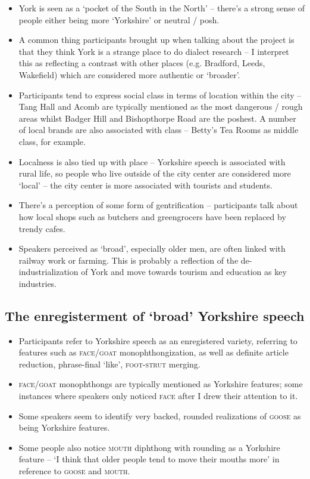 \documentclass{article}
\begin{document}
\begin{itemize}
\item{York is seen as a `pocket of the South in the North' -- there's a strong sense of people either being more `Yorkshire' or neutral / posh.}
\item{A common thing participants brought up when talking about the project is that they think York is a strange place to do dialect research -- I interpret this as reflecting a contrast with other places (e.g. Bradford, Leeds, Wakefield) which are considered more authentic or `broader'.}
\item{Participants tend to express social class in terms of location within the city -- Tang Hall and Acomb are typically mentioned as the most dangerous / rough areas whilst Badger Hill and Bishopthorpe Road are the poshest. A number of local brands are also associated with class -- Betty's Tea Rooms as middle class, for example.}
\item{Localness is also tied up with place -- Yorkshire speech is associated with rural life, so people who live outside of the city center are considered more `local' -- the city center is more associated with tourists and students.}
\item{There's a perception of some form of gentrification -- participants talk about how local shops such as butchers and greengrocers have been replaced by trendy cafes.}
\item{Speakers perceived as `broad', especially older men, are often linked with railway work or farming. This is probably a reflection of the de-industrialization of York and move towards tourism and education as key industries.}

\end{itemize}
\subsection*{The enregisterment of `broad' Yorkshire speech}
\begin{itemize}
\item{Participants refer to Yorkshire speech as an enregistered variety, referring to features such as \textsc{face}/\textsc{goat} monophthongization, as well as definite article reduction, phrase-final `like', \textsc{foot-strut} merging.}
\item{\textsc{face}/\textsc{goat} monophthongs are typically mentioned as Yorkshire features; some instances where speakers only noticed \textsc{face} after I drew their attention to it.}
\item{Some speakers seem to identify very backed, rounded realizations of \textsc{goose} as being Yorkshire features.}
\item{Some people also notice \textsc{mouth} diphthong with rounding as a Yorkshire feature -- `I think that older people tend to move their mouths more' in reference to \textsc{goose} and \textsc{mouth}.}
\end{itemize}
\end{document}
